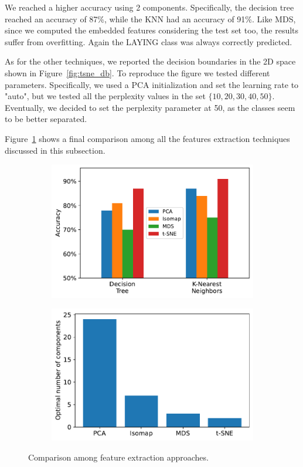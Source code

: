\documentclass[10pt, a4paper, twocolumn]{article}
\begin{document}
We reached a higher accuracy using 2 components. Specifically, the decision tree reached an accuracy of 87\%, while the KNN had an accuracy of 91\%. Like MDS, since we computed the embedded features considering the test set too, the results suffer from overfitting. Again the LAYING class was always correctly predicted.

As for the other techniques, we reported the decision boundaries in the 2D space shown in Figure~\ref{fig:tsne_db}. To reproduce the figure we tested different parameters. Specifically, we used a PCA initialization and set the learning rate to "auto", but we tested all the perplexity values in the set $\{10,20,30,40,50\}$. Eventually, we decided to set the perplexity parameter at 50, as the classes seem to be better separated.

Figure~\ref{fig:comparison_fe} shows a final comparison among all the features extraction techniques discussed in this subsection.

\begin{figure}
\centering
    \begin{subfigure}[t]{0.49\linewidth}
        \includegraphics[width=\linewidth]{immagini simone/fe_comparisons.pdf}
    \end{subfigure}
    \hfill%
    \begin{subfigure}[t]{0.49\columnwidth}
        \includegraphics[width=\linewidth]{immagini simone/fe_n_components.pdf}
    \end{subfigure}
\caption{Comparison among feature extraction approaches.}
\label{fig:comparison_fe}
\end{figure}
\end{document}
